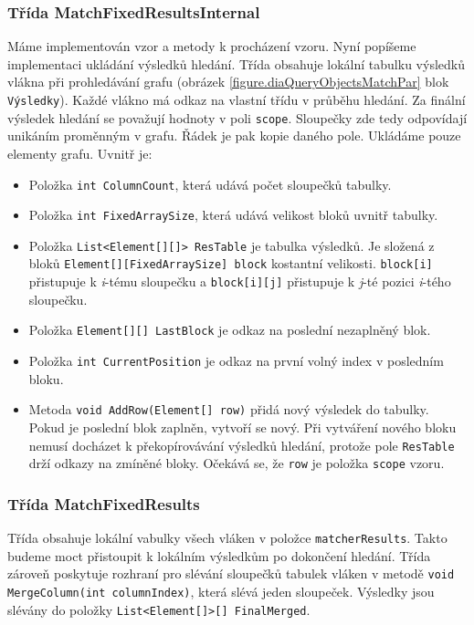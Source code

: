 \subsubsection{Třída MatchFixedResultsInternal}

Máme implementován vzor a metody k procházení vzoru.
Nyní popíšeme implementaci ukládání výsledků hledání.
Třída obsahuje lokální tabulku výsledků vlákna při prohledávání grafu (obrázek \ref{figure.diaQueryObjectsMatchPar} blok \texttt{Výsledky}). 
Každé vlákno má odkaz na vlastní třídu v průběhu hledání.
Za finální výsledek hledání se považují hodnoty v poli \texttt{scope}.
Sloupečky zde tedy odpovídají unikáním proměnným v grafu.
Řádek je pak kopie daného pole.
Ukládáme pouze elementy grafu.
Uvnitř je:
\begin{itemize}
\item Položka \texttt{int ColumnCount}, která udává počet sloupečků tabulky. 
\item Položka \texttt{int FixedArraySize}, která udává velikost bloků uvnitř tabulky.
\item Položka \texttt{List<Element[][]> ResTable} je tabulka výsledků. 
Je složená z bloků \texttt{Element[][FixedArraySize] block} kostantní velikosti.
\texttt{block[i]} přistupuje k \textit{i}-tému sloupečku a \texttt{block[i][j]} přistupuje k \textit{j}-té pozici \textit{i}-tého sloupečku.
\item Položka \texttt{Element[][] LastBlock} je odkaz na poslední nezaplněný blok.
\item Položka \texttt{int CurrentPosition} je odkaz na první volný index v posledním bloku.
\item Metoda \texttt{void AddRow(Element[] row)} přidá nový výsledek do tabulky.
Pokud je poslední blok zaplněn, vytvoří se nový.
Při vytváření nového bloku nemusí docházet k překopírovávání výsledků hledání, protože pole \texttt{ResTable} drží odkazy na zmíněné bloky.
Očekává se, že \texttt{row} je položka \texttt{scope} vzoru. 

\end{itemize}

\subsubsection{Třída MatchFixedResults}

Třída obsahuje lokální vabulky všech vláken v položce \texttt{matcherResults}.
Takto budeme moct přistoupit k lokálním výsledkům po dokončení hledání.
Třída zároveň poskytuje rozhraní pro slévání sloupečků tabulek vláken v metodě \texttt{void MergeColumn(int columnIndex)}, která slévá jeden sloupeček.
Výsledky jsou slévány do položky \texttt{List<Element[]>[] FinalMerged}.

